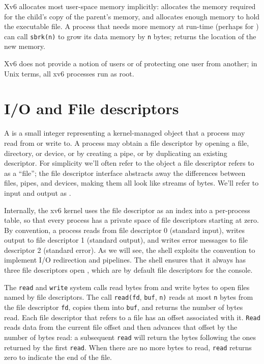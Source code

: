 Xv6 allocates most user-space memory
implicitly:
allocates the memory required for the child's copy of the
parent's memory, and 
allocates enough memory to hold the executable file.
A process that needs more memory at run-time (perhaps for
)
can call
\lstinline{sbrk(n)}
to grow its data memory by
\lstinline{n}
bytes;
returns the location of the new memory.

Xv6 does not provide a notion of users or of protecting
one user from another; in Unix terms, all xv6 processes
run as root.
\section{I/O and File descriptors}

A 
is a small integer representing a kernel-managed object
that a process may read from or write to.
A process may obtain a file descriptor by opening a file, directory,
or device, or by creating a pipe, or by duplicating an existing
descriptor.
For simplicity we'll often refer to the object a file descriptor
refers to as a ``file'';
the file descriptor interface abstracts away the differences between
files, pipes, and devices, making them all look like streams of bytes.
We'll refer to input and output as .

Internally, the xv6 kernel uses the file descriptor
as an index into a per-process table,
so that every process has a private space of file descriptors
starting at zero.
By convention, a process reads from file descriptor 0 (standard input),
writes output to file descriptor 1 (standard output), and
writes error messages to file descriptor 2 (standard error).
As we will see, the shell exploits the convention to implement I/O redirection
and pipelines. The shell ensures that it always has three file descriptors
open
,
which are by default file descriptors for the console.

The
\lstinline{read}
and
\lstinline{write}
system calls read bytes from and write bytes to
open files named by file descriptors.
The call
\lstinline{read(fd},
\lstinline{buf},
\lstinline{n)}
reads at most
\lstinline{n}
bytes from the file descriptor
\lstinline{fd},
copies them into
\lstinline{buf},
and returns the number of bytes read.
Each file descriptor that refers to a file
has an offset associated with it.
\lstinline{Read}
reads data from the current file offset and then advances
that offset by the number of bytes read:
a subsequent
\lstinline{read}
will return the bytes following the ones returned by the first
\lstinline{read}.
When there are no more bytes to read,
\lstinline{read}
returns zero to indicate the end of the file.

